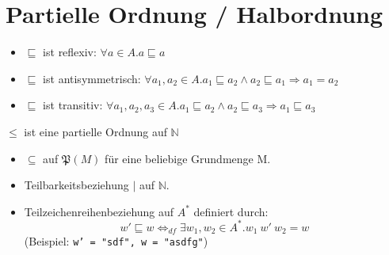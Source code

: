 \documentclass{article}
\begin{document}
\large
\section*{Partielle Ordnung / Halbordnung}
\begin{defBox}[5.1]
	\begin{itemize}[label=]
		\item $\sqsubseteq$ ist reflexiv: {\color{colCornYellow} $\forall a \in A. a \sqsubseteq a$}
		\item $\sqsubseteq$ ist antisymmetrisch: {\color{colCornYellow} $\forall a_1, a_2 \in A. a_1 \sqsubseteq a_2 \land a_2 \sqsubseteq a_1 \Rightarrow a_1 = a_2$}
		\item $\sqsubseteq$ ist transitiv: {\color{colCornYellow} $\forall a_1, a_2, a_3 \in A. a_1 \sqsubseteq a_2 \land a_2 \sqsubseteq a_3 \Rightarrow a_1 \sqsubseteq a_3$}
	\end{itemize}
\end{defBox}
\begin{senBox}[5.1]
	\begin{center}
		$\leq$ ist eine partielle Ordnung auf $\mathbb{N}$
	\end{center}
\end{senBox}
\begin{exampleBox}
	\begin{itemize}[label=]
		\item $\subseteq$ auf $\mathfrak{P}(M)$ für eine beliebige Grundmenge M.
		\item Teilbarkeitsbeziehung $|$ auf $\mathbb{N}$.
		\item Teilzeichenreihenbeziehung auf $A^{*}$ definiert durch:
		\[
			w' \sqsubseteq w \Leftrightarrow_{df} \exists w_1, w_2 \in A^{*}. w_1\ w'\ w_2 = w
		\]
		(Beispiel: \texttt{w' = "sdf", w = "asdfg"})
	\end{itemize}
\end{exampleBox}
\end{document}
